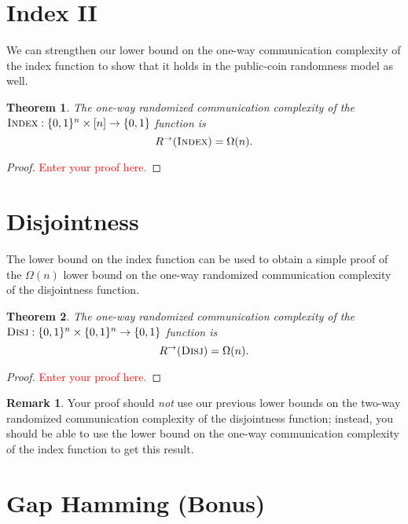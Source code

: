 \documentclass[11pt]{amsart}
\theoremstyle{plain}
\newtheorem{theorem}{Theorem}
\theoremstyle{definition}
\newtheorem{remark}{Remark}
\theoremstyle{plain}
\newcommand{\Disj}{\textsc{Disj}}
\newcommand{\Index}{\textsc{Index}}
\newcommand{\replacethistext}[1]{\textcolor{red}{#1}}
\begin{document}
\newpage 
\section{Index II}

We can strengthen our lower bound on the one-way communication complexity of the index function to show that it holds in the public-coin randomness model as well.

\begin{theorem}
The one-way randomized communication complexity of the $\Index : \{0,1\}^n \times [n] \to \{0,1\}$ function is
\[
R^\rightarrow(\Index) = \Omega(n).
\]
\end{theorem}

\begin{proof}
\replacethistext{Enter your proof here.}
\end{proof}



\newpage 
\section{Disjointness}

The lower bound on the index function can be used to obtain a simple proof of the $\Omega(n)$ lower bound on the one-way randomized communication complexity of the disjointness function.

\begin{theorem}
The one-way randomized communication complexity of the $\Disj : \{0,1\}^n \times \{0,1\}^n \to \{0,1\}$ function is
\[
R^\rightarrow(\Disj) = \Omega(n).
\]
\end{theorem}

\begin{proof}
\replacethistext{Enter your proof here.}
\end{proof}

\begin{remark}
Your proof should \emph{not} use our previous lower bounds on the two-way randomized communication complexity of the disjointness function; instead, you should be able to use the lower bound on the one-way communication complexity of the index function to get this result.
\end{remark}



\newpage 
\section{Gap Hamming (Bonus)}
\end{document}
